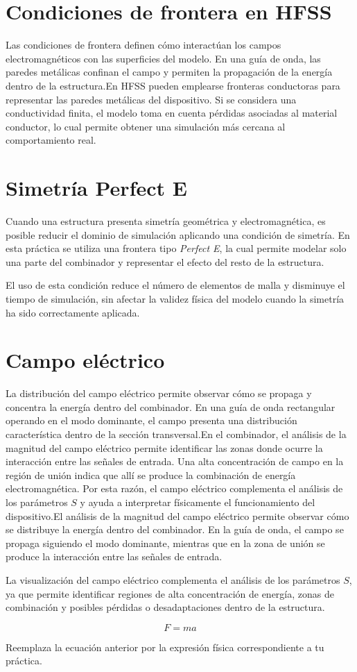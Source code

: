 \section{Condiciones de frontera en HFSS}

Las condiciones de frontera definen cómo interactúan los campos electromagnéticos con las superficies del modelo. En una guía de onda, las paredes metálicas confinan el campo y permiten la propagación de la energía dentro de la estructura.En HFSS pueden emplearse fronteras conductoras para representar las paredes metálicas del dispositivo. Si se considera una conductividad finita, el modelo toma en cuenta pérdidas asociadas al material conductor, lo cual permite obtener una simulación más cercana al comportamiento real.

\section{Simetría Perfect E}

Cuando una estructura presenta simetría geométrica y electromagnética, es posible reducir el dominio de simulación aplicando una condición de simetría. En esta práctica se utiliza una frontera tipo \textit{Perfect E}, la cual permite modelar solo una parte del combinador y representar el efecto del resto de la estructura.

El uso de esta condición reduce el número de elementos de malla y disminuye el tiempo de simulación, sin afectar la validez física del modelo cuando la simetría ha sido correctamente aplicada.

\section{Campo eléctrico}

La distribución del campo eléctrico permite observar cómo se propaga y concentra la energía dentro del combinador. En una guía de onda rectangular operando en el modo dominante, el campo presenta una distribución característica dentro de la sección transversal.En el combinador, el análisis de la magnitud del campo eléctrico permite identificar las zonas donde ocurre la interacción entre las señales de entrada. Una alta concentración de campo en la región de unión indica que allí se produce la combinación de energía electromagnética. Por esta razón, el campo eléctrico complementa el análisis de los parámetros $S$ y ayuda a interpretar físicamente el funcionamiento del dispositivo.El análisis de la magnitud del campo eléctrico permite observar cómo se distribuye la energía dentro del combinador. En la guía de onda, el campo se propaga siguiendo el modo dominante, mientras que en la zona de unión se produce la interacción entre las señales de entrada.

La visualización del campo eléctrico complementa el análisis de los parámetros $S$, ya que permite identificar regiones de alta concentración de energía, zonas de combinación y posibles pérdidas o desadaptaciones dentro de la estructura.

\begin{equation}
    F = ma
\end{equation}

Reemplaza la ecuación anterior por la expresión física correspondiente a tu práctica.
